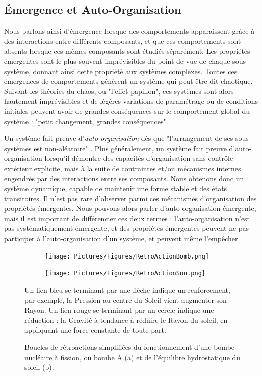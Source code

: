 			\subsection{Émergence et Auto-Organisation}
			
			Nous parlons ainsi d'émergence lorsque des comportements apparaissent grâce à des interactions entre différents composants, et que ces comportements sont absents lorsque ces mêmes composants sont étudiés séparément. Les propriétés émergentes sont le plus souvent imprévisibles du point de vue de chaque sous-système, donnant ainsi cette propriété aux systèmes complexes. Toutes ces émergences de comportements génèrent un système qui peut être dit chaotique. 
			Suivant les théories du chaos, ou "l'effet papillon", ces systèmes sont alors hautement imprévisibles et de légères variations de paramétrage ou de conditions initiales peuvent avoir de grandes conséquences sur le comportement global du système : "petit changement, grandes conséquences".
			
			Un système fait preuve d'\textit{auto-organisation} dès que "l'arrangement de ses sous-systèmes est non-aléatoire" \cite{goos_self-organisation_2003}. Plus généralement, un système fait preuve d'auto-organisation lorsqu'il démontre des capacités d'organisation sans contrôle extérieur explicite, mais à la suite de contraintes et/ou mécanismes internes engendrés par des interactions entre ses composants. Nous obtenons donc un système dynamique, capable de maintenir une forme stable et des états transitoires. Il n'est pas rare d'observer parmi ces mécanismes d'organisation des propriétés émergentes. Nous pouvons alors parler d'auto-organisation émergente, mais il est important de différencier ces deux termes : l'auto-organisation n'est pas systématiquement émergente, et des propriétés émergentes peuvent ne pas participer à l'auto-organisation d'un système, et peuvent même l'empêcher.
			
			\begin{figure}
			\centering
			\begin{subfigure}{0.45\textwidth}
        		\centering
         		\texttt{[image: Pictures/Figures/RetroActionBomb.png]}
         		\caption{}
         		\label{bomb}
     		\end{subfigure}
     		\hfill
			\begin{subfigure}{0.45\textwidth}
        		\centering
         		\texttt{[image: Pictures/Figures/RetroActionSun.png]}
         		\caption{}
         		\label{sun}
     		\end{subfigure}
			\caption{Boucles de rétroactions simplifiées du fonctionnement d'une bombe nucléaire à fission, ou bombe A (a) et de l'équilibre hydrostatique du soleil (b).}{Un lien bleu se terminant par une flèche indique un renforcement, par exemple, la Pression au centre du Soleil vient augmenter son Rayon. Un lien rouge se terminant par un cercle indique une réduction : la Gravité à tendance à réduire le Rayon du soleil, en appliquant une force constante de toute part.}
			\label{RetroActions}
			\end{figure}
			
